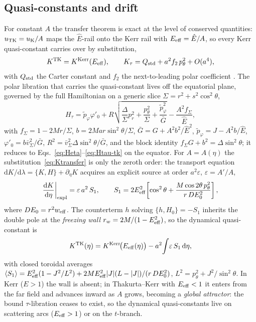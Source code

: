 \documentclass[12pt]{iopart}
\newcommand{\Ehat}{\hat E}
\newcommand{\dd}{\mathrm{d}}
\begin{document}
\subsection{Quasi-constants and drift}
\label{sec:quasiconst}
For constant $A$ the transfer theorem is exact at the level of conserved
quantities: $u_{\rm TK}=u_{\rm K}/A$ maps the $\Ehat$-rail onto the Kerr rail with
$E_{\rm eff}=\Ehat/A$, so every Kerr quasi-constant carries over by substitution,
\begin{equation}
    K^{\rm TK}=K^{\rm Kerr}(E_{\rm eff}),\qquad
    K_\tau=Q_{\rm std}+a^2 f_2\,p_\theta^2+O(a^4),
    \label{eq:Ktransfer}
\end{equation}
with $Q_{\rm std}$ the Carter constant and $f_2$ the next-to-leading polar
coefficient \cite{Carter1968,RosignoliKerr}. The polar libration that carries the
quasi-constant lives off the equatorial plane, governed by the full Hamiltonian
on a generic slice $\Sigma=r^2+s^2\cos^2\theta$,
\begin{equation}
    H_\tau=\tilde p_\varphi\varphi'_0
      +R\sqrt{\frac{\Delta}{\Sigma}p_r^2+\frac{p_\theta^2}{\Sigma}
      +\frac{\tilde p_\varphi^2}{\bar G}}-\frac{A^2 f_\Sigma}{\Ehat},
    \label{eq:H3d}
\end{equation}
with $f_\Sigma=1-2Mr/\Sigma$, $b=2Mar\sin^2\theta/\Sigma$,
$\bar G=G+A^2 b^2/\Ehat^2$, $\tilde p_\varphi=J-A^2 b/\Ehat$,
$\varphi'_0=b\bar v_\Sigma^2/\bar G$, $R^2=\bar v_\Sigma^2\Delta\sin^2\theta/\bar G$,
and the block identity $f_\Sigma G+b^2=\Delta\sin^2\theta$; it reduces to
Eqs.~\eqref{eq:Heta}--\eqref{eq:Htau-tk} on the equator. For $A=A(\eta)$ the
substitution~\eqref{eq:Ktransfer} is only the zeroth order: the transport equation
$\dd K/\dd\lambda=\{K,H\}+\partial_\eta K$ acquires an explicit source at order
$a^2\varepsilon$, $\varepsilon=A'/A$,
\begin{equation}
    \frac{\dd K}{\dd\eta}\bigg|_{\rm expl}=\varepsilon\,a^2\,S_1,\qquad
    S_1=2E_{\rm eff}^2\!\left[\cos^2\theta
        +\frac{M\cos2\theta\,p_\theta^2}{r\,DE_0^2}\right],
    \label{eq:S1}
\end{equation}
where $DE_0=r^2 w_{\rm eff}$. The counterterm $h$ solving $\{h,H_0\}=-S_1$
inherits the double pole at the \emph{freezing wall}
$r_w=2M/(1-E_{\rm eff}^2)$, so the dynamical quasi-constant is
\begin{equation}
    K^{\rm TK}(\eta)=K^{\rm Kerr}\!\big(E_{\rm eff}(\eta)\big)
        -a^2\!\int\!\varepsilon\,S_1\,\dd\eta,
    \label{eq:Kdyn}
\end{equation}
with closed toroidal averages
$\langle S_1\rangle=E_{\rm eff}^2(1-J^2/L^2)
+2ME_{\rm eff}^2|J|(L-|J|)/(r\,DE_0^2)$, $L^2=p_\theta^2+J^2/\sin^2\theta$. In
Kerr ($E>1$) the wall is absent; in Thakurta--Kerr with $E_{\rm eff}<1$ it enters
from the far field and advances inward as $A$ grows, becoming a \emph{global
attractor}: the bound $\tau$-libration ceases to exist, so the dynamical
quasi-constants live on scattering arcs ($E_{\rm eff}>1$) or on the $t$-branch.
\end{document}
